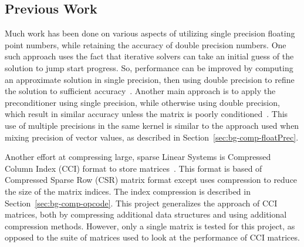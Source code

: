 \subsection{Previous Work}
Much work has been done on various aspects of utilizing single precision floating point numbers, while retaining the accuracy of double precision numbers.
One such approach uses the fact that iterative solvers can take an initial guess of the solution to jump start progress.
So, performance can be improved by computing an approximate solution in single precision, then using double precision to refine the solution to sufficient accuracy~\cite{Babolin:2008:coursePass, Buttari:2007:coursePass}.
Another main approach is to apply the preconditioner using single precision, while otherwise using double precision, which result in similar accuracy unless the matrix is poorly conditioned~\cite{Buttari:2008:mixedPrec, Hogg:2010:multiplePasses}.
This use of multiple precisions in the same kernel is similar to the approach used when mixing precision of vector values, as described in Section~\ref{sec:bg-comp-floatPrec}.

Another effort at compressing large, sparse Linear Systems is Compressed Column Index (CCI) format to store matrices~\cite{Lawlor:2013:compression}.
This format is based of Compressed Sparse Row (CSR) matrix format except uses compression to reduce the size of the matrix indices.
The index compression is described in Section~\ref{sec:bg-comp-opcode}.
This project generalizes the approach of CCI matrices, both by compressing additional data structures and using additional compression methods.
However, only a single matrix is tested for this project, as opposed to the suite of matrices used to look at the performance of CCI matrices.